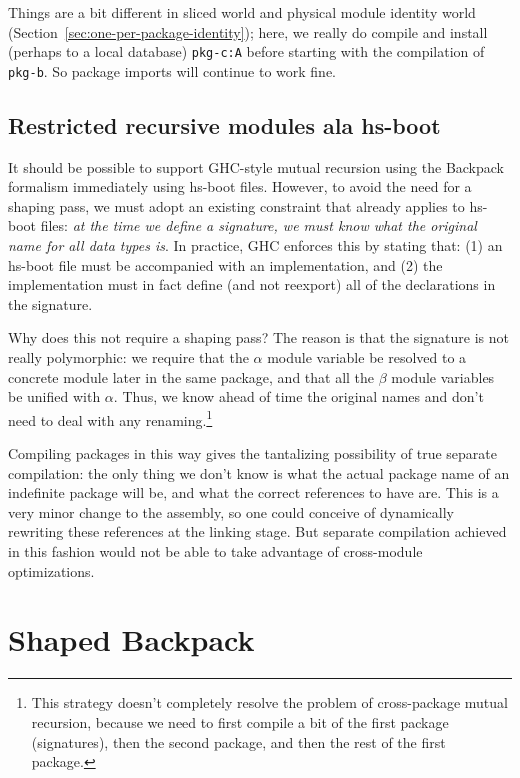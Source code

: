 \documentclass{article}
\begin{document}
Things are a bit different in sliced world and physical module identity
world (Section~\ref{sec:one-per-package-identity}); here, we really do
compile and install (perhaps to a local database) \verb|pkg-c:A| before
starting with the compilation of \verb|pkg-b|.  So package imports will
continue to work fine.

\subsection{Restricted recursive modules ala hs-boot}\label{sec:hs-boot-restrict}

It should be possible to support GHC-style mutual recursion using the
Backpack formalism immediately using hs-boot files.  However, to avoid
the need for a shaping pass, we must adopt an existing constraint that
already applies to hs-boot files: \emph{at the time we define a signature,
we must know what the original name for all data types is}.  In practice,
GHC enforces this by stating that: (1) an hs-boot file must be
accompanied with an implementation, and (2) the implementation must
in fact define (and not reexport) all of the declarations in the signature.

Why does this not require a shaping pass? The reason is that the
signature is not really polymorphic: we require that the $\alpha$ module
variable be resolved to a concrete module later in the same package, and
that all the $\beta$ module variables be unified with $\alpha$. Thus, we
know ahead of time the original names and don't need to deal with any
renaming.\footnote{This strategy doesn't completely resolve the problem
of cross-package mutual recursion, because we need to first compile a
bit of the first package (signatures), then the second package, and then
the rest of the first package.}

Compiling packages in this way gives the tantalizing possibility
of true separate compilation: the only thing we don't know is what the actual
package name of an indefinite package will be, and what the correct references
to have are.  This is a very minor change to the assembly, so one could conceive
of dynamically rewriting these references at the linking stage.  But
separate compilation achieved in this fashion would not be able to take
advantage of cross-module optimizations.

\section{Shaped Backpack}
\end{document}
